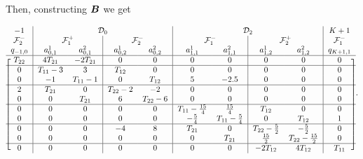 Then, constructing \({  \boldsymbol B}\) we get 
\begin{center}
\[
\begin{blockarray}{c|cc|cc|cc|cc|c}
{-1} & \BAmulticolumn{4}{c|}{\calD_0} & \BAmulticolumn{4}{c|}{\calD_2} & {K+1}\\
\calF_2^- & \BAmulticolumn{2}{c|}{\calF_1^+} & \BAmulticolumn{2}{c|}{\calF_2^-} & \BAmulticolumn{2}{c|}{\calF_1^-} & \BAmulticolumn{2}{c|}{\calF_2^+} & \calF_1^-\\
q_{{-1},0} & a_{0,1}^1 & a_{0,1}^2 & a_{0,2}^1 & a_{0,2}^2 & a_{1,1}^1 & a_{1,1}^2 & a_{1,2}^1 & a_{1,2}^2 & q_{{K+1},1}\\\BAhline
\begin{block}{[c|cc|cc|cc|cc|c]} 
T_{22} & 4T_{21} & -2T_{21} & 0 & 0 & 0 & 0 & 0 & 0 & 0\\\BAhline
0 & T_{11}-3 & 3 & T_{12} & 0 & 0 & 0 & 0 & 0 & 0 \\
0 & -1 & T_{11}-1 & 0 & T_{12} & 5 & -2.5 & 0 & 0 & 0 \\\BAhline 
2 & T_{21} & 0 & T_{22}-2 & -2 & 0 & 0 & 0 & 0 & 0 \\ 
0 & 0 & T_{21} & 6 & T_{22}-6 & 0 & 0 & 0 & 0 & 0\\\BAhline
0 & 0 & 0 & 0 & 0 & T_{11}-\frac{15}{4} & \frac{15}{4} & T_{12} & 0 & 0 \\ 
0 & 0 & 0 & 0 & 0 & -\frac{5}{4} & T_{11}-\frac{5}{4} & 0 & T_{12} &1\\\BAhline
0 & 0 & 0 & -4 & 8 & T_{21} & 0 & T_{22}-\frac{5}{2} & -\frac{5}{2} & 0 \\
0 & 0 & 0 & 0 & 0 & 0 & T_{21} & \frac{15}{2} & T_{22}-\frac{15}{2} & 0 \\\BAhline
0 & 0 & 0 & 0 & 0 & 0 & 0 & -2T_{12} & 4T_{12} & T_{11} \\
\end{block}
\end{blockarray}.
\]
\end{center}

